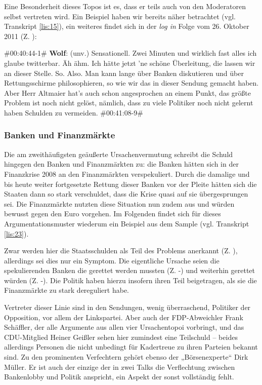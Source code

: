 Eine Besonderheit dieses Topos ist es, dass er teils auch von den Moderatoren selbst vertreten wird. Ein Beispiel haben wir bereits näher betrachtet (vgl. Transkript \vref{lis:15}), ein weiteres findet sich in der \textit{log in} Folge vom 26. Oktober 2011 (Z. ):

\begin{description}
	\begin{linenumbers}[1]
		\item \#00:40:44-1\# \textbf{Wolf}: (unv.) Sensationell. Zwei Minuten und wirklich fast alles ich glaube twitterbar. Äh ähm. Ich hätte jetzt 'ne schöne Überleitung, die lassen wir an dieser Stelle. So. Also. Man kann lange über Banken diskutieren und über Rettungsschirme philosophieren, so wie wir das in dieser Sendung gemacht haben. Aber Herr Altmaier hat's auch schon angesprochen an einem Punkt, das größte Problem ist noch nicht gelöst, nämlich, dass zu viele Politiker noch nicht gelernt haben Schulden zu vermeiden.  \#00:41:08-9\#
	\end{linenumbers}
\end{description}

\subsubsection{Banken und Finanzmärkte}

Die am zweithäufigsten geäußerte Ursachenvermutung schreibt die Schuld hingegen den Banken und Finanzmärkten zu: die Banken hätten sich in der Finanzkrise 2008 an den Finanzmärkten verspekuliert. Durch die damalige und bis heute weiter fortgesetzte Rettung dieser Banken vor der Pleite hätten sich die Staaten dann so stark verschuldet, dass die Krise quasi auf sie übergesprungen sei. Die Finanzmärkte nutzten diese Situation nun zudem aus und würden bewusst gegen den Euro vorgehen. Im Folgenden findet sich für dieses Argumentationsmuster wiederum ein Beispiel aus dem Sample (vgl. Transkript \vref{lis:23}).

Zwar werden hier die Staatsschulden als Teil des Problems anerkannt (Z. ), allerdings sei dies nur ein Symptom. Die eigentliche Ursache seien die spekulierenden Banken die gerettet werden mussten (Z. -) und weiterhin gerettet würden (Z. -). Die Politik haben hierzu insofern ihren Teil beigetragen, als sie die Finanzmärkte zu stark dereguliert habe.

Vertreter dieser Linie sind in den Sendungen, wenig überraschend, Politiker der Opposition, vor allem der Linkspartei. Aber auch der FDP-Abweichler Frank Schäffler, der alle Argumente aus allen vier Ursachentopoi vorbringt, und das CDU-Mitglied Heiner Geißler sehen hier zumindest eine Teilschuld – beides allerdings Personen die nicht unbedingt für Kadertreue zu ihren Parteien bekannt sind. Zu den prominenten Verfechtern gehört ebenso der „Börsenexperte“ Dirk Müller. Er ist auch der einzige der in zwei Talks die Verflechtung zwischen Bankenlobby und Politik anspricht, ein Aspekt der sonst vollständig fehlt.

